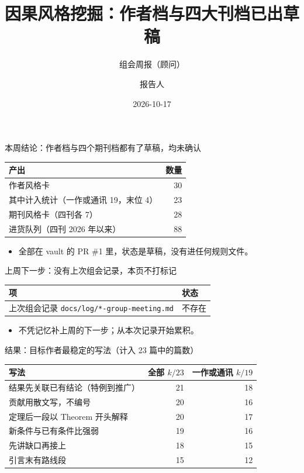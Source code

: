 \documentclass[aspectratio=169,10pt]{beamer}
\title{因果风格挖掘：作者档与四大刊档已出草稿}
\subtitle{组会周报（顾问）}
\author{报告人}
\institute{研究组}
\date{2026-10-17}
\begin{document}
\begin{frame}
  \titlepage
\end{frame}

\begin{frame}{本周结论：作者档与四个期刊档都有了草稿，均未确认}
  \begin{tabular}{lr}
    \toprule
    产出 & 数量 \\
    \midrule
    作者风格卡 & 30 \\
    其中计入统计（一作或通讯 19，末位 4） & 23 \\
    期刊风格卡（四刊各 7） & 28 \\
    进货队列（四刊 2026 年以来） & 88 \\
    \bottomrule
  \end{tabular}
  \begin{itemize}
    \item 全部在 vault 的 PR \#1 里，状态是草稿，没有进任何规则文件。
  \end{itemize}
\end{frame}

\begin{frame}{上周下一步：没有上次组会记录，本页不打标记}
  \begin{tabular}{ll}
    \toprule
    项 & 状态 \\
    \midrule
    上次组会记录 \texttt{docs/log/*-group-meeting.md} & 不存在 \\
    \bottomrule
  \end{tabular}
  \begin{itemize}
    \item 不凭记忆补上周的下一步；从本次记录开始累积。
  \end{itemize}
\end{frame}

\begin{frame}{结果：目标作者最稳定的写法（计入 23 篇中的篇数）}
  \begin{tabular}{lrr}
    \toprule
    写法 & 全部 \(k/23\) & 一作或通讯 \(k/19\) \\
    \midrule
    结果先关联已有结论（特例到推广） & 21 & 18 \\
    贡献用散文写，不编号 & 20 & 16 \\
    定理后一段以 Theorem 开头解释 & 20 & 17 \\
    新条件与已有条件比强弱 & 19 & 16 \\
    先讲缺口再接上 & 18 & 15 \\
    引言末有路线段 & 15 & 12 \\
    \bottomrule
  \end{tabular}
\end{frame}
\end{document}
